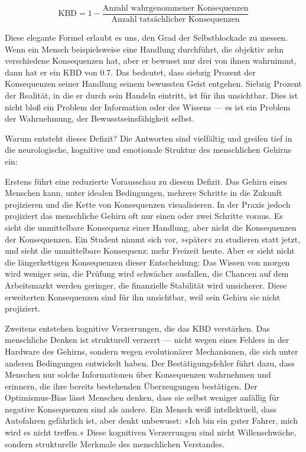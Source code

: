 \documentclass[12pt,a4paper]{article}
\begin{document}
\begin{equation}
\text{KBD} = 1 - \frac{\text{Anzahl wahrgenommener Konsequenzen}}{\text{Anzahl tatsächlicher Konsequenzen}}
\end{equation}

Diese elegante Formel erlaubt es uns, den Grad der Selbstblockade zu messen. Wenn ein Mensch beispielsweise eine Handlung durchführt, die objektiv zehn verschiedene Konsequenzen hat, aber er bewusst nur drei von ihnen wahrnimmt, dann hat er ein KBD von 0.7. Das bedeutet, dass siebzig Prozent der Konsequenzen seiner Handlung seinem bewussten Geist entgehen. Siebzig Prozent der Realität, in die er durch sein Handeln eintritt, ist für ihn unsichtbar. Dies ist nicht bloß ein Problem der Information oder des Wissens — es ist ein Problem der Wahrnehmung, der Bewusstseinsfähigkeit selbst.

Warum entsteht dieses Defizit? Die Antworten sind vielfältig und greifen tief in die neurologische, kognitive und emotionale Struktur des menschlichen Gehirns ein:

Erstens führt eine reduzierte Vorausschau zu diesem Defizit. Das Gehirn eines Menschen kann, unter idealen Bedingungen, mehrere Schritte in die Zukunft projizieren und die Kette von Konsequenzen visualisieren. In der Praxis jedoch projiziert das menschliche Gehirn oft nur einen oder zwei Schritte voraus. Es sieht die unmittelbare Konsequenz einer Handlung, aber nicht die Konsequenzen der Konsequenzen. Ein Student nimmt sich vor, »später« zu studieren statt jetzt, und sieht die unmittelbare Konsequenz: mehr Freizeit heute. Aber er sieht nicht die längerkettigen Konsequenzen dieser Entscheidung: Das Wissen von morgen wird weniger sein, die Prüfung wird schwächer ausfallen, die Chancen auf dem Arbeitsmarkt werden geringer, die finanzielle Stabilität wird unsicherer. Diese erweiterten Konsequenzen sind für ihn unsichtbar, weil sein Gehirn sie nicht projiziert.

Zweitens entstehen kognitive Verzerrungen, die das KBD verstärken. Das menschliche Denken ist strukturell verzerrt — nicht wegen eines Fehlers in der Hardware des Gehirns, sondern wegen evolutionärer Mechanismen, die sich unter anderen Bedingungen entwickelt haben. Der Bestätigungsfehler führt dazu, dass Menschen nur solche Informationen über Konsequenzen wahrnehmen und erinnern, die ihre bereits bestehenden Überzeugungen bestätigen. Der Optimismus-Bias lässt Menschen denken, dass sie selbst weniger anfällig für negative Konsequenzen sind als andere. Ein Mensch weiß intellektuell, dass Autofahren gefährlich ist, aber denkt unbewusst: »Ich bin ein guter Fahrer, mich wird es nicht treffen.« Diese kognitiven Verzerrungen sind nicht Willenschwäche, sondern strukturelle Merkmale des menschlichen Verstandes.
\end{document}
